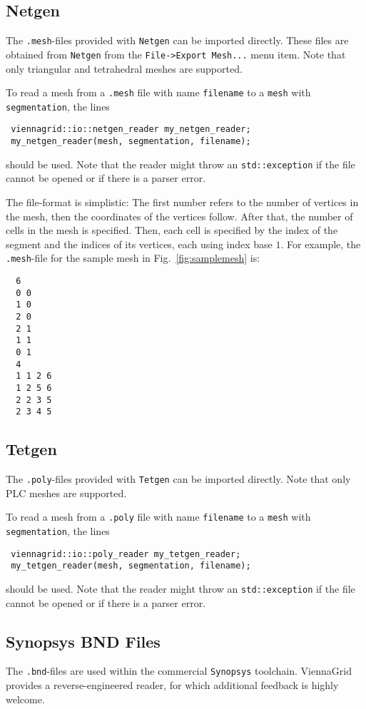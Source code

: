  \subsection{Netgen}
 The \texttt{.mesh}-files provided with \texttt{Netgen} \cite{netgen} can be imported directly.
 These files are obtained from \texttt{Netgen} from the \texttt{File->Export Mesh...} menu item. Note that only triangular and tetrahedral meshes are supported.

 To read a mesh from a \texttt{.mesh} file with name \lstinline|filename| to a \lstinline|mesh| with \lstinline|segmentation|, the lines
 \begin{lstlisting}
 viennagrid::io::netgen_reader my_netgen_reader;
 my_netgen_reader(mesh, segmentation, filename);
 \end{lstlisting}
 should be used. Note that the reader might throw an \lstinline|std::exception| if the file cannot be opened or if there is a parser error.

 The file-format is simplistic: The first number refers to the number of vertices in the mesh, then the coordinates of the vertices follow. After that, the number of cells in the mesh is specified. Then, each cell is specified by the index of the segment and the indices of its vertices, each using index base $1$.
 For example, the \texttt{.mesh}-file for the sample mesh in Fig.~\ref{fig:samplemesh} is:
 \begin{verbatim}
  6
  0 0
  1 0
  2 0
  2 1
  1 1
  0 1
  4
  1 1 2 6
  1 2 5 6
  2 2 3 5
  2 3 4 5
 \end{verbatim}

 \subsection{Tetgen}
 The \texttt{.poly}-files provided with \texttt{Tetgen} \cite{tetgen} can be imported directly. Note that only PLC meshes are supported.

 To read a mesh from a \texttt{.poly} file with name \lstinline|filename| to a \lstinline|mesh| with \lstinline|segmentation|, the lines
 \begin{lstlisting}
 viennagrid::io::poly_reader my_tetgen_reader;
 my_tetgen_reader(mesh, segmentation, filename);
 \end{lstlisting}
 should be used. Note that the reader might throw an \lstinline|std::exception| if the file cannot be opened or if there is a parser error.

 \subsection{Synopsys BND Files}
 The \texttt{.bnd}-files are used within the commercial \texttt{Synopsys} toolchain.
 ViennaGrid provides a reverse-engineered reader, for which additional feedback is highly welcome.

